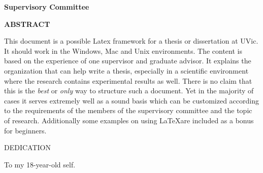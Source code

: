 \newpage
{}

\noindent \textbf{Supervisory Committee}
\tpbreak
\panel

\begin{center}
\textbf{ABSTRACT}
\end{center}
\begin{center}
    This document is a possible Latex framework for a thesis or dissertation at UVic. It should work in the Windows, Mac and Unix environments. The content is based on the experience of one supervisor and graduate advisor. It explains the organization that can help write a thesis, especially in a scientific environment where the research contains experimental results as well. There is no claim that this is the \textit{best} or \textit{only} way to structure such a document. Yet in the majority of cases it serves extremely well as a sound basis which can be customized according to the requirements of the members of the supervisory committee and the topic of  research. Additionally some examples on using \LaTeX are included as a bonus for beginners.
\end{center}

\tableofcontents
{}\listoftables
\setcounter{lofdepth}{2}
\listoffigures


\newpage
{}
\begin{center}
    DEDICATION
\end{center}
\begin{center}
    To my 18-year-old self.
\end{center}

\newpage
\pagestyle{myheadings}
